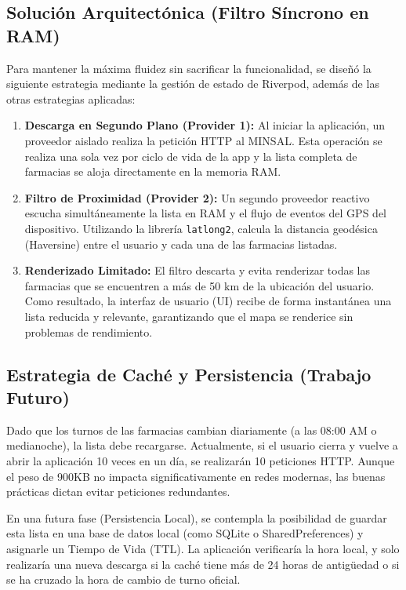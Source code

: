 \documentclass[12pt,a4paper]{article}
\begin{document}
\subsection{Solución Arquitectónica (Filtro Síncrono en RAM)}
Para mantener la máxima fluidez sin sacrificar la funcionalidad, se diseñó la siguiente estrategia mediante la gestión de estado de Riverpod, además de las otras estrategias aplicadas:

\begin{enumerate}
    \item \textbf{Descarga en Segundo Plano (Provider 1):} Al iniciar la aplicación, un proveedor aislado realiza la petición HTTP al MINSAL. Esta operación se realiza una sola vez por ciclo de vida de la app y la lista completa de farmacias se aloja directamente en la memoria RAM.
    \item \textbf{Filtro de Proximidad (Provider 2):} Un segundo proveedor reactivo escucha simultáneamente la lista en RAM y el flujo de eventos del GPS del dispositivo. Utilizando la librería \texttt{latlong2}, calcula la distancia geodésica (Haversine) entre el usuario y cada una de las farmacias listadas.
    \item \textbf{Renderizado Limitado:} El filtro descarta y evita renderizar todas las farmacias que se encuentren a más de 50 km de la ubicación del usuario. Como resultado, la interfaz de usuario (UI) recibe de forma instantánea una lista reducida y relevante, garantizando que el mapa se renderice sin problemas de rendimiento.
\end{enumerate}

\subsection{Estrategia de Caché y Persistencia (Trabajo Futuro)}
Dado que los turnos de las farmacias cambian diariamente (a las 08:00 AM o medianoche), la lista debe recargarse. Actualmente, si el usuario cierra y vuelve a abrir la aplicación 10 veces en un día, se realizarán 10 peticiones HTTP. Aunque el peso de 900KB no impacta significativamente en redes modernas, las buenas prácticas dictan evitar peticiones redundantes.

En una futura fase (Persistencia Local), se contempla la posibilidad de guardar esta lista en una base de datos local (como SQLite o SharedPreferences) y asignarle un Tiempo de Vida (TTL). La aplicación verificaría la hora local, y solo realizaría una nueva descarga si la caché tiene más de 24 horas de antigüedad o si se ha cruzado la hora de cambio de turno oficial.
\end{document}
